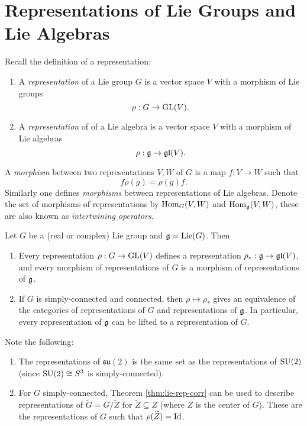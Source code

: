 \section{Representations of Lie Groups and Lie Algebras}

\begin{definition}
  Recall the definition of a representation:
  \begin{enumerate}
    \item A \emph{representation} of a
      Lie group $G$ is a vector space $V$
      with a morphism of Lie groups
      \[\rho : G \to \operatorname{GL}(V).\]
    \item A \emph{representation} of 
      of a Lie algebra is a vector space
      $V$ with a morphism of Lie algebras
      \[
        \rho : \mathfrak{g} \to \mathfrak{gl}(V).
      \]
  \end{enumerate}
  A \emph{morphism} between two
  representations $V, W$ of $G$ is a
  map $f : V \to W$ such that
  \[
    f \rho(g) = \rho(g) f.
  \]
  Similarly one defines \emph{morphisms}
  between representations of Lie algebras.
  Denote the set of morphisms of
  representations by
  $\operatorname{Hom}_G(V, W)$ and $\operatorname{Hom}_{\mathfrak{g}}(V, W)$,
  these are also known as \emph{intertwining
  operators}.
\end{definition}

\begin{theorem}\label{thm:lie-rep-corr}
  Let $G$ be a (real or complex) Lie group
  and $\mathfrak{g} = \operatorname{Lie}(G)$. Then
  \begin{enumerate}
    \item Every representation
      $\rho : G \to \operatorname{GL}(V)$ defines a
      representation $\rho_* : \mathfrak{g} \to \mathfrak{gl}(V)$,
      and every morphism of representations
      of $G$ is a morphism of representations
      of $\mathfrak{g}$.
    \item If $G$ is simply-connected and
      connected, then $\rho \mapsto \rho_*$
      gives an equivalence of the
      categories of representations
      of $G$ and representations of $\mathfrak{g}$.
      In particular, every representation
      of $\mathfrak{g}$ can be lifted to a
      representation of $G$.
  \end{enumerate}
\end{theorem}

\begin{remark}
  Note the following:
  \begin{enumerate}
    \item The representations of
      $\mathfrak{su}(2)$ is the same
      set as the representations
      of $\operatorname{SU}(2)$ (since $\operatorname{SU}(2) \cong S^3$
      is simply-connected).
    \item For $G$ simply-connected,
      Theorem \ref{thm:lie-rep-corr}
      can be used to describe representations
      of $\widetilde{G} = G / \widetilde{Z}$
      for $\widetilde{Z} \subseteq Z$
      (where $Z$ is the center of $G$).
      These are the representations of $G$
      such that $\rho(\widetilde{Z}) = \operatorname{Id}$.
  \end{enumerate}
\end{remark}

